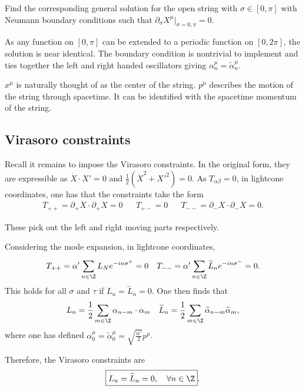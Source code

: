 \begin{exercise}
    Find the corresponding general solution for the open string with $\sigma \in [ 0,\pi ]$ with Neumann boundary conditions such that $\partial_\sigma X^{\mu} \bigg|_{\sigma = 0, \pi} = 0$.

    As any function on $[0,\pi]$ can be extended to a periodic function on $[0,2\pi]$, the solution is near identical. The boundary condition is nontrivial to implement and ties together the left and right handed oscillators giving $\alpha^{\mu}_n = \widetilde{\alpha}_n^{\mu}$.
\end{exercise}

$x^{\mu}$ is naturally thought of as the center of the string. $p^{\mu}$ describes the motion of the string through spacetime. It can be identified with the spacetime momentum of the string.

\subsection{Virasoro constraints}

Recall it remains to impose the Virasoro constraints. In the original form, they are expressible as $\dot{X} \cdot X' = 0$ and $\frac{1}{2} \left( \dot{X}^2 + X'^2 \right) = 0$. As $T_{\alpha \beta} = 0$, in lightcone coordinates, one has that the constraints take the form
\begin{align}
    T_{+ +} = \partial_+ X \cdot \partial_+ X = 0 && T_{+-} = 0 && T_{- -} = \partial_- X \cdot \partial_- X = 0
.\end{align}

These pick out the left and right moving parts respectively.

Considering the mode expansion, in lightcone coordinates,
\begin{align}
    T_{++} = \alpha' \sum_{n \in \Z}^{} L_N e^{-i n \sigma^{+}} = 0 && T_{--} = \alpha' \sum_{n \in \Z}^{} \widetilde{L}_n e^{-i n \sigma^{-}} = 0
.\end{align}
This holds for all $\sigma$ and $\tau$ if $L_n = \widetilde{L}_n = 0$. One then finds that
\begin{align}
    L_n = \frac{1}{2} \sum_{m \in \Z}^{}  \alpha_{n - m} \cdot \alpha_{m} && \widetilde{L}_n = \frac{1}{2} \sum_{m \in \Z}^{} \widetilde{\alpha}_{n - m} \widetilde{\alpha}_m
,\end{align}
where one has defined $\alpha_0^{\mu} = \widetilde{\alpha}^{\mu}_0 = \sqrt{\frac{\alpha'}{2}} p^{\mu}$.

Therefore, the Virasoro constraints are
\begin{align}
    \fbox{$\displaystyle L_n = \widetilde{L}_n = 0, \quad \forall n \in \Z$}
.\end{align}

